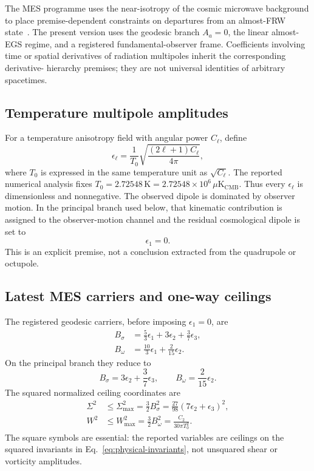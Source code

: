 \documentclass[11pt,a4paper]{article}
\newcommand{\microK}{\mu\mathrm{K}_{\mathrm{CMB}}}
\begin{document}
The MES programme uses the near-isotropy of the cosmic microwave background
to place premise-dependent constraints on departures from an almost-FRW
state~\cite{MaartensEllisStoeger1995,StoegerAraujoGebbie1997}.  The present
version uses the geodesic branch $A_a=0$, the linear almost-EGS regime, and a
registered fundamental-observer frame.  Coefficients involving time or spatial
derivatives of radiation multipoles inherit the corresponding derivative-
hierarchy premises; they are not universal identities of arbitrary spacetimes.

\subsection{Temperature multipole amplitudes}

For a temperature anisotropy field with angular power $C_\ell$, define
\begin{equation}
\epsilon_\ell
=\frac{1}{T_0}
\sqrt{\frac{(2\ell+1)C_\ell}{4\pi}},
\label{eq:epsilon}
\end{equation}
where $T_0$ is expressed in the same temperature unit as $\sqrt{C_\ell}$.
The reported numerical analysis fixes
$T_0=2.72548\,\mathrm{K}=2.72548\times10^6\,\microK$.  Thus every
$\epsilon_\ell$ is dimensionless and nonnegative.  The observed
dipole is dominated by observer motion.  In the principal branch used below,
that kinematic contribution is assigned to the observer-motion channel and the
residual cosmological dipole is set to
\[
\epsilon_1=0.
\]
This is an explicit premise, not a conclusion extracted from the quadrupole or
octupole.

\subsection{Latest MES carriers and one-way ceilings}

The registered geodesic carriers, before imposing $\epsilon_1=0$, are
\begin{align}
B_\sigma&=\frac{5}{3}\epsilon_1+3\epsilon_2+\frac{3}{7}\epsilon_3,
\label{eq:bsigma-general}\\
B_\omega&=\frac{10}{3}\epsilon_1+\frac{2}{15}\epsilon_2.
\label{eq:bomega-general}
\end{align}
On the principal branch they reduce to
\[
B_\sigma=3\epsilon_2+\frac{3}{7}\epsilon_3,
\qquad
B_\omega=\frac{2}{15}\epsilon_2.
\]
The squared normalized ceiling coordinates are
\begin{align}
\Sigma^2&\leq\Sigma^2_{\max}
=\frac{3}{2}B_\sigma^2
=\frac{27}{98}(7\epsilon_2+\epsilon_3)^2,
\label{eq:sigma-ceiling}\\
W^2&\leq W^2_{\max}
=\frac{3}{2}B_\omega^2
=\frac{C_2}{30\pi T_0^2}.
\label{eq:omega-ceiling}
\end{align}
The square symbols are essential: the reported variables are ceilings on the
squared invariants in Eq.~\eqref{eq:physical-invariants}, not unsquared shear
or vorticity amplitudes.
\end{document}
